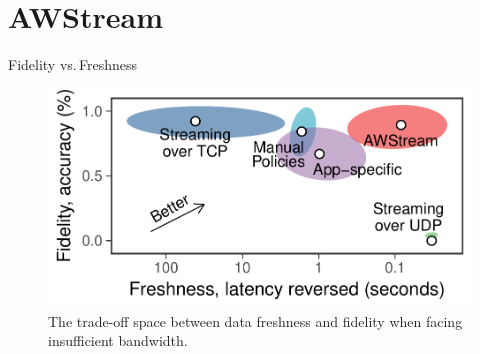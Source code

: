 \section{AWStream}

\begin{frame}{Fidelity vs.\,Freshness}
  \begin{figure}
    \centering
    \includegraphics[width=0.8\columnwidth]{figures/fidelity-freshness.pdf}
    \caption{The trade-off space between data freshness and fidelity when facing
      insufficient bandwidth.}
  \end{figure}
\end{frame}

